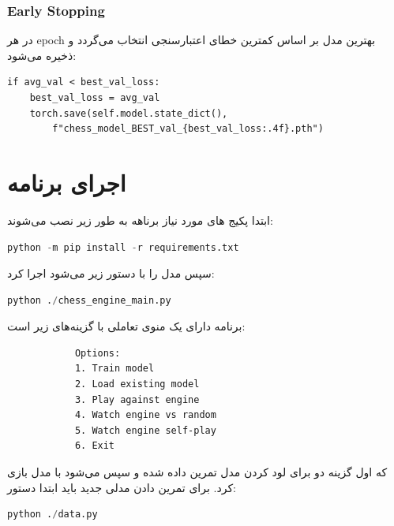 \documentclass[12pt,a4paper]{article}
\begin{document}
	\subsubsection{Early Stopping}
	 در هر epoch  بهترین مدل بر اساس کمترین خطای اعتبارسنجی انتخاب می‌گردد و ذخیره می‌شود:
	\\
	\begin{latin}
\begin{verbatim}
if avg_val < best_val_loss:
    best_val_loss = avg_val
    torch.save(self.model.state_dict(), 
        f"chess_model_BEST_val_{best_val_loss:.4f}.pth")
\end{verbatim}
	\end{latin}
	
	\section{اجرای برنامه}
ابتدا پکیج های مورد نیاز برناهه به طور زیر نصب می‌شوند:
\\

		\begin{latin}
		\begin{lstlisting}[language=Python]
python -m pip install -r requirements.txt
		\end{lstlisting}
	\end{latin}
سپس مدل را با دستور زیر می‌شود اجرا کرد:
\\
		\begin{latin}
	\begin{lstlisting}[language=Python]
python ./chess_engine_main.py
	\end{lstlisting}
\end{latin}

	برنامه دارای یک منوی تعاملی با گزینه‌های زیر است:
	\\
	\begin{latin}
		\begin{verbatim}
			Options:
			1. Train model
			2. Load existing model
			3. Play against engine
			4. Watch engine vs random
			5. Watch engine self-play
			6. Exit
		\end{verbatim}
	\end{latin}
	
	که اول گزینه دو برای لود کردن مدل تمرین داده شده و سپس می‌شود با مدل بازی کرد.
	برای تمرین دادن مدلی جدید باید ابتدا دستور:
	\\
			\begin{latin}
		\begin{lstlisting}[language=Python]
python ./data.py
		\end{lstlisting}
	\end{latin}
\end{document}
